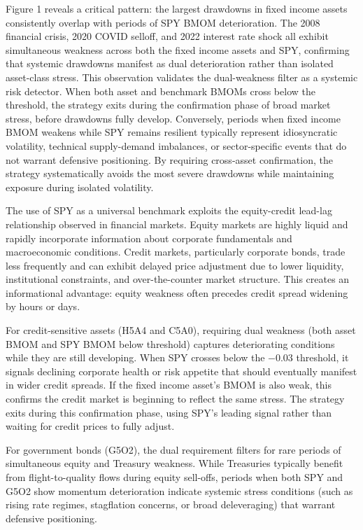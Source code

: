 \documentclass[11pt, letterpaper]{article}
\begin{document}
Figure 1 reveals a critical pattern: the largest drawdowns in fixed income assets consistently overlap with periods of SPY BMOM deterioration. The 2008 financial crisis, 2020 COVID selloff, and 2022 interest rate shock all exhibit simultaneous weakness across both the fixed income assets and SPY, confirming that systemic drawdowns manifest as dual deterioration rather than isolated asset-class stress. This observation validates the dual-weakness filter as a systemic risk detector. When both asset and benchmark BMOMs cross below the threshold, the strategy exits during the confirmation phase of broad market stress, before drawdowns fully develop. Conversely, periods when fixed income BMOM weakens while SPY remains resilient typically represent idiosyncratic volatility, technical supply-demand imbalances, or sector-specific events that do not warrant defensive positioning. By requiring cross-asset confirmation, the strategy systematically avoids the most severe drawdowns while maintaining exposure during isolated volatility.

The use of SPY as a universal benchmark exploits the equity-credit lead-lag relationship observed in financial markets. Equity markets are highly liquid and rapidly incorporate information about corporate fundamentals and macroeconomic conditions. Credit markets, particularly corporate bonds, trade less frequently and can exhibit delayed price adjustment due to lower liquidity, institutional constraints, and over-the-counter market structure. This creates an informational advantage: equity weakness often precedes credit spread widening by hours or days.

For credit-sensitive assets (H5A4 and C5A0), requiring dual weakness (both asset BMOM and SPY BMOM below threshold) captures deteriorating conditions while they are still developing. When SPY crosses below the $-0.03$ threshold, it signals declining corporate health or risk appetite that should eventually manifest in wider credit spreads. If the fixed income asset's BMOM is also weak, this confirms the credit market is beginning to reflect the same stress. The strategy exits during this confirmation phase, using SPY's leading signal rather than waiting for credit prices to fully adjust.

For government bonds (G5O2), the dual requirement filters for rare periods of simultaneous equity and Treasury weakness. While Treasuries typically benefit from flight-to-quality flows during equity sell-offs, periods when both SPY and G5O2 show momentum deterioration indicate systemic stress conditions (such as rising rate regimes, stagflation concerns, or broad deleveraging) that warrant defensive positioning.
\end{document}
